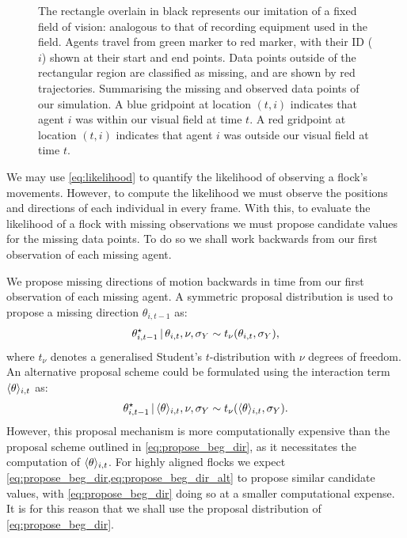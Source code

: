\begin{figure}[tbp]
{    The rectangle overlain in black represents our imitation of a fixed
    field of vision: analogous to that of recording equipment used in the
    field. Agents travel from green marker to red marker, with their ID ($i$)
    shown at their start and end points. Data points outside of the rectangular
    region are classified as missing, and are shown by red trajectories.
     Summarising the missing and observed data
    points of our simulation. A blue gridpoint at location $(t, i)$ indicates
    that agent $i$ was within our visual field at time $t$. A red gridpoint at
    location $(t, i)$ indicates that agent $i$ was outside our visual field
    at time $t$.}
  \label{fig:beg_data}
\end{figure}

We may use \cref{eq:likelihood} to quantify the likelihood of observing a
flock's movements. However, to compute the likelihood we must observe the
positions and directions of each individual in every frame. With this, to
evaluate the likelihood of a flock with missing observations we must propose
candidate values for the missing data points. To do so we shall work backwards
from our first observation of each missing agent.

We propose missing directions of motion backwards in time from our first
observation of each missing agent. A symmetric proposal distribution is used
to propose a missing direction $\theta_{i,t-1}$ as:
\begin{equation}
  \label{eq:propose_beg_dir}
  \theta_{i,t-1}^{\star} \,|\,  \theta_{i,t}, \nu, \sigma_Y
    \sim t_{\nu}(\theta_{i,t}, \sigma_Y),
\end{equation}
where $t_{\nu}$ denotes a generalised Student's $t$-distribution with $\nu$
degrees of freedom. An alternative proposal scheme could be formulated using
the interaction term $\langle\theta\rangle_{i,t}$ as:
\begin{equation}
  \label{eq:propose_beg_dir_alt}
  \theta_{i,t-1}^{\star} \,|\, \langle\theta\rangle_{i,t}, \nu, \sigma_Y
    \sim t_{\nu}(\langle\theta\rangle_{i,t}, \sigma_Y).
\end{equation}
However, this proposal mechanism is more computationally expensive than the
proposal scheme outlined in \cref{eq:propose_beg_dir}, as it necessitates the
computation of $\langle\theta\rangle_{i,t}$. For highly aligned flocks we expect
\cref{eq:propose_beg_dir,eq:propose_beg_dir_alt} to propose similar candidate
values, with \cref{eq:propose_beg_dir} doing so at a smaller computational
expense. It is for this reason that we shall use the proposal distribution of
\cref{eq:propose_beg_dir}.

